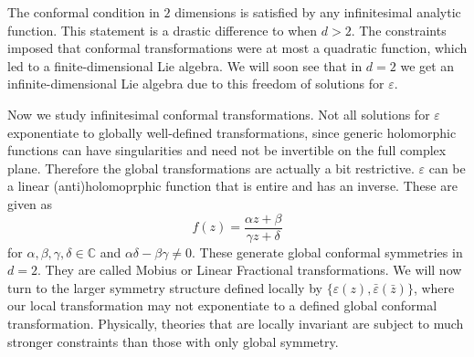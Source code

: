 \documentclass{article}
\begin{document}
The conformal condition in $2$ dimensions is satisfied by any infinitesimal analytic function. This statement is a drastic difference to when $d>2$. The constraints imposed that conformal transformations were at most a quadratic function, which led to a finite-dimensional Lie algebra. We will soon see that in $d = 2$ we get an infinite-dimensional Lie algebra due to this freedom of solutions for $\varepsilon$.

Now we study infinitesimal conformal transformations. Not all solutions for $\varepsilon$ exponentiate to globally well-defined transformations, since generic holomorphic functions can have singularities and need not be invertible on the full complex plane. Therefore the global transformations are actually a bit restrictive. $\varepsilon$ can be a linear (anti)holomoprphic function that is entire and has an inverse. These are given as
\begin{equation}
    f(z) = \frac{\alpha z + \beta}{\gamma z + \delta}
\end{equation}
for $\alpha, \beta, \gamma, \delta \in \mathds{C}$ and $\alpha\delta-\beta\gamma \neq 0$. These generate global conformal symmetries in $d = 2$. They are called Mobius or Linear Fractional transformations. We will now turn to the larger symmetry structure defined locally by $\{\varepsilon(z),\bar{\varepsilon}(\bar{z})\}$, where our local transformation may not exponentiate to a defined global conformal transformation. Physically, theories that are locally invariant are subject to much stronger constraints than those with only global symmetry.
\end{document}
